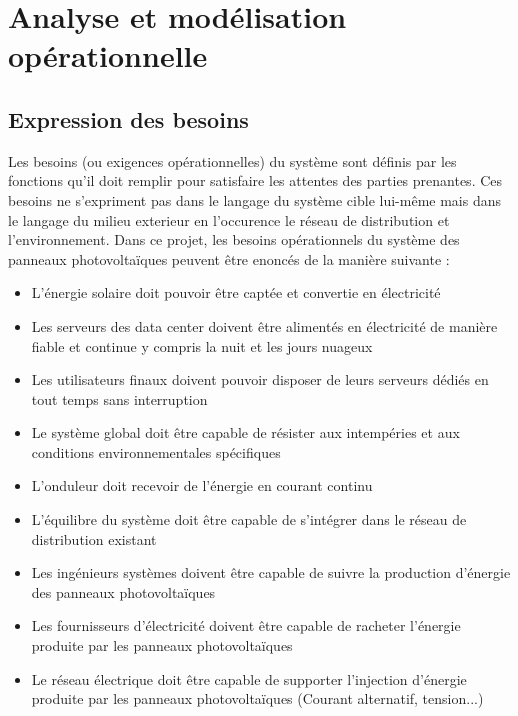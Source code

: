 \documentclass{article}
\begin{document}
\section{Analyse et modélisation opérationnelle}
\subsection{Expression des besoins}
Les besoins (ou exigences opérationnelles) du système sont définis par les fonctions qu'il doit remplir pour satisfaire les attentes des parties prenantes. Ces besoins ne s'expriment pas dans le langage du système cible lui-même mais dans le langage du milieu exterieur en l'occurence le réseau de distribution et l'environnement. Dans ce projet, les besoins opérationnels du système des panneaux photovoltaïques peuvent être enoncés de la manière suivante : 

\begin{itemize}
    \item L'énergie solaire doit pouvoir être captée et convertie en électricité  
    \item Les serveurs des data center doivent être alimentés en électricité de manière fiable et continue y compris la nuit et les jours nuageux
    \item Les utilisateurs finaux doivent pouvoir disposer de leurs serveurs dédiés en tout temps sans interruption
    \item Le système global doit être capable de résister aux intempéries et aux conditions environnementales spécifiques
    \item L'onduleur doit recevoir de l'énergie en courant continu
    \item L'équilibre du système doit être capable de s'intégrer dans le réseau de distribution existant
    \item Les ingénieurs systèmes doivent être capable de suivre la production d'énergie des panneaux photovoltaïques 
    \item Les fournisseurs d'électricité doivent être capable de racheter l'énergie produite par les panneaux photovoltaïques
    \item Le réseau électrique doit être capable de supporter l'injection d'énergie produite par les panneaux photovoltaïques (Courant alternatif, tension...)

\end{itemize}
\end{document}
